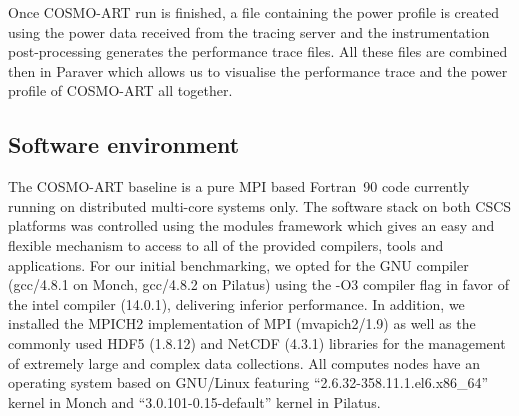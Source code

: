 Once COSMO-ART run is finished, a file containing the power profile is
created using the power data  received from the tracing server and the
instrumentation post-processing generates the performance trace files.
All  these files  are  combined then  in  Paraver which  allows us  to
visualise the performance trace and the power profile of COSMO-ART all
together.




\subsection{Software environment}
\label{subsec:3.2}

The COSMO-ART baseline  is a pure MPI based  Fortran~90 code currently
running on distributed multi-core systems only.  The software stack on
both CSCS  platforms was controlled using the  modules framework which
gives an easy and flexible mechanism  to access to all of the provided
compilers, tools  and applications.  For our  initial benchmarking, we
opted for the GNU compiler  (gcc/4.8.1 on Monch, gcc/4.8.2 on Pilatus)
using the -O3  compiler flag in favor of  the intel compiler (14.0.1),
delivering inferior performance.  In addition, we installed the MPICH2
implementation of MPI (mvapich2/1.9) as well as the commonly used HDF5
(1.8.12) and NetCDF (4.3.1)  libraries for the management of extremely
large  and  complex data  collections.   All  computes  nodes have  an
operating      system      based      on      GNU/Linux      featuring
``2.6.32-358.11.1.el6.x86\_64''      kernel      in     Monch      and
``3.0.101-0.15-default'' kernel in Pilatus.

